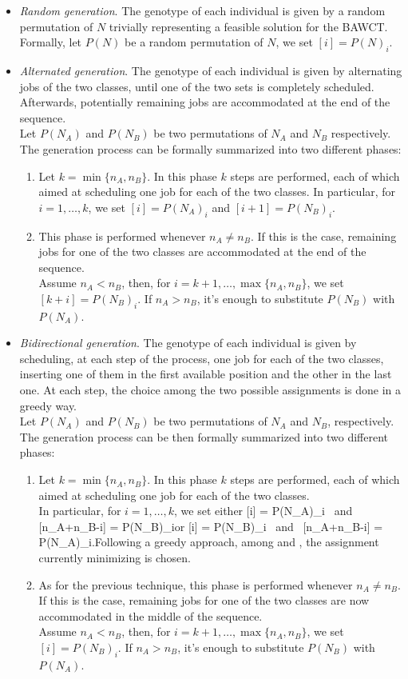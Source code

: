 \documentclass[opre,nonblindrev]{informs3} %
\begin{document}
\begin{itemize}
	\item \textit{Random generation}. The genotype of each individual is given by a random permutation of $N$ trivially representing a feasible solution for the BAWCT. Formally, let $P(N)$ be a random permutation of $N$, we set $[i] =  P(N)_i$. 
	\item \textit{Alternated generation}. The genotype of each individual is given by alternating jobs of the two classes, until one of the two sets is completely scheduled. Afterwards, potentially remaining jobs are accommodated at the end of the sequence.\\
	 Let $P(N_A)$ and $P(N_B)$ be two permutations of $N_A$ and $N_B$ respectively. The generation process can be formally summarized into two different phases:
	\begin{enumerate}
		\item Let $k = \min\{n_A,n_B\}$. In this phase $k$ steps are performed, each of which aimed at scheduling one job for each of the two classes. In particular, for $i=1,\ldots,k$, we set $[i] = P(N_A)_i$ and $[i+1] = P(N_B)_i$.
		\item This phase is performed whenever $n_A \ne n_B$. If this is the case, remaining jobs for one of the two classes are accommodated at the end of the sequence.\\ Assume $n_A<n_B$, then, for $i=k+1,\ldots,\max\{n_A,n_B\}$, we set $[k+i] = P(N_B)_i.$ If $n_A>n_B$, it's enough to substitute $P(N_B)$ with $P(N_A)$. 
	\end{enumerate}
	\item \textit{Bidirectional generation}. The genotype of each individual is given by scheduling, at each step of the process, one job for each of the two classes, inserting one of them in the first available position and the other in the last one. At each step, the choice among the two possible assignments is done in a greedy way.\\
	Let $P(N_A)$ and $P(N_B)$ be two permutations of $N_A$ and $N_B$, respectively. The generation process can be then formally summarized into two different phases:
	\begin{enumerate}
		\item Let $k = \min\{n_A,n_B\}$. In this phase $k$ steps are performed, each of which aimed at scheduling one job for each of the two classes.\\ In particular, for $i=1,\ldots,k$, we set either \be \label{eq1}[i] = P(N_A)_i \mbox{ and } [n_A+n_B-i] = P(N_B)_i\ee or \be \label{eq2}[i] = P(N_B)_i \mbox{ and } [n_A+n_B-i] = P(N_A)_i.\ee Following a greedy approach, among  and , the assignment currently minimizing  is chosen.  
		\item As for the previous technique, this phase is performed whenever $n_A \ne n_B$. If this is the case, remaining jobs for one of the two classes are now accommodated in the middle of the sequence. \\Assume $n_A<n_B$, then, for $i=k+1,\ldots,\max\{n_A,n_B\}$, we set $[i] = P(N_B)_i.$ If $n_A>n_B$, it's enough to substitute $P(N_B)$ with $P(N_A)$. 
	\end{enumerate}


\end{itemize}
\end{document}
